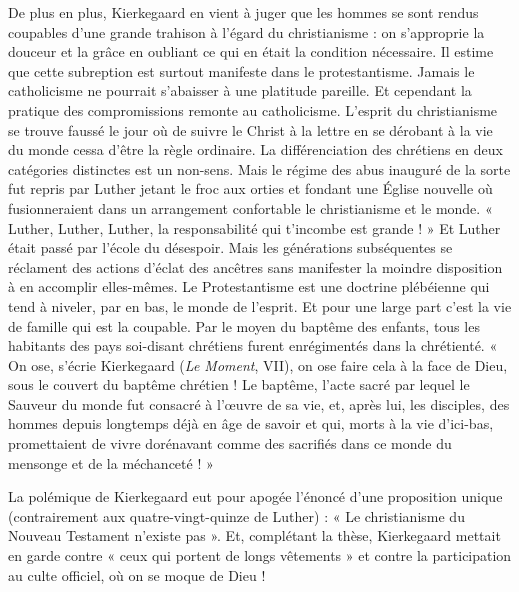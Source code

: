 \documentclass[12pt,a4paper]{article}
\newcommand{\opage}[1]{\marginnote{\footnotesize\textit{[#1]}}}
\begin{document}
De plus en plus, Kierkegaard en vient à juger que les hommes se
sont rendus coupables d'une grande trahison à l'égard du christianisme :
on s'approprie la douceur et la grâce en oubliant ce qui en
était la condition nécessaire. Il estime que cette subreption est
surtout manifeste dans le protestantisme. Jamais le catholicisme ne
pourrait s'abaisser à une platitude pareille. Et cependant la pratique
des compromissions remonte au catholicisme. L'esprit du christianisme
se trouve faussé le jour où de suivre le Christ à la lettre en
se dérobant à la vie du monde cessa d'être la règle ordinaire. La
différenciation des chrétiens en deux catégories distinctes est un
non-sens. Mais le régime des abus inauguré de la sorte fut repris
par Luther jetant le froc aux orties et fondant une Église nouvelle
où fusionneraient dans un arrangement confortable le christianisme
et le monde. « Luther, Luther, Luther, la responsabilité qui
t'incombe est grande ! » Et Luther était passé par l'école du désespoir.
Mais les générations subséquentes se réclament des actions
d'éclat des ancêtres sans manifester la moindre disposition à en
accomplir elles-mêmes. Le Protestantisme est une doctrine plébéienne
qui tend à niveler, par en bas, le monde de l'esprit. Et pour
une large part c'est la vie de famille qui est la coupable. Par le
\opage{241} moyen du baptême des enfants, tous les habitants des pays soi-disant
chrétiens furent enrégimentés dans la chrétienté. « On ose,
s'écrie Kierkegaard (\emph{Le Moment}, VII), on ose faire cela à la face de
Dieu, sous le couvert du baptême chrétien ! Le baptême, l'acte sacré
par lequel le Sauveur du monde fut consacré à l'œuvre de sa vie,
et, après lui, les disciples, des hommes depuis longtemps déjà en
âge de savoir et qui, morts à la vie d'ici-bas, promettaient de vivre
dorénavant comme des sacrifiés dans ce monde du mensonge et de
la méchanceté ! »

La polémique de Kierkegaard eut pour apogée l'énoncé d'une proposition
unique (contrairement aux quatre-vingt-quinze de Luther) :
« Le christianisme du Nouveau Testament n'existe pas ». Et, complétant
la thèse, Kierkegaard mettait en garde contre « ceux qui portent
de longs vêtements » et contre la participation au culte officiel,
où on se moque de Dieu !
\end{document}
